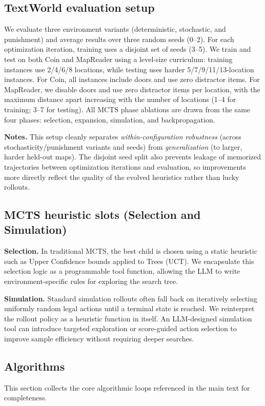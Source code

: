 \documentclass{article}
\begin{document}
\subsection{TextWorld evaluation setup}
\label{app:textworld_setup}
We evaluate three environment variants (deterministic, stochastic, and punishment) and average results over three random seeds (0--2). For each optimization iteration, training uses a disjoint set of seeds (3--5). We train and test on both Coin and MapReader using a level-size curriculum: training instances use 2/4/6/8 locations, while testing uses harder 5/7/9/11/13-location instances. For Coin, all instances include doors and use zero distractor items. For MapReader, we disable doors and use zero distractor items per location, with the maximum distance apart increasing with the number of locations (1--4 for training; 3--7 for testing). All MCTS phase ablations are drawn from the same four phases: selection, expansion, simulation, and backpropagation.

\noindent\textbf{Notes.} This setup cleanly separates \emph{within-configuration robustness} (across stochasticity/punishment variants and seeds) from \emph{generalization} (to larger, harder held-out maps). The disjoint seed split also prevents leakage of memorized trajectories between optimization iterations and evaluation, so improvements more directly reflect the quality of the evolved heuristics rather than lucky rollouts.

\subsection{MCTS heuristic slots (Selection and Simulation)}
\label{app:mcts_slots}
\noindent\textbf{Selection.} In traditional MCTS, the best child is chosen using a static heuristic such as Upper Confidence bounds applied to Trees (UCT). We encapsulate this selection logic as a programmable tool function, allowing the LLM to write environment-specific rules for exploring the search tree.

\noindent\textbf{Simulation.} Standard simulation rollouts often fall back on iteratively selecting uniformly random legal actions until a terminal state is reached. We reinterpret the rollout policy as a heuristic function in itself. An LLM-designed simulation tool can introduce targeted exploration or score-guided action selection to improve sample efficiency without requiring deeper searches.

\subsection{Algorithms}
\label{app:algorithms}
\noindent This section collects the core algorithmic loops referenced in the main text for completeness.
\end{document}
